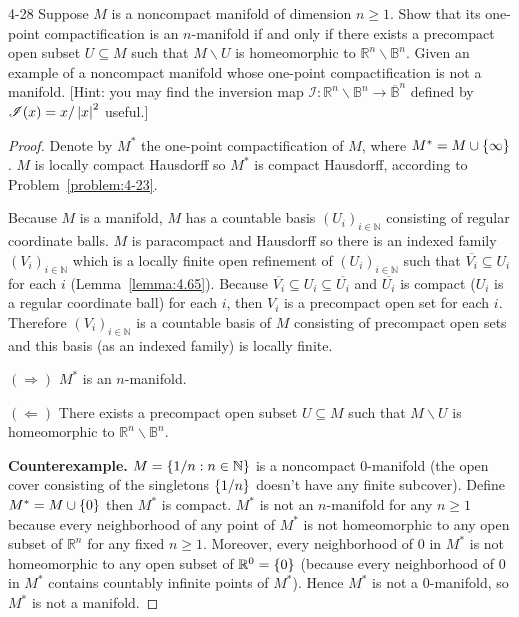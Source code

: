 \begin{problem}{4-28}
Suppose $M$ is a noncompact manifold of dimension $n\geq 1$. Show that its one-point compactification is an $n$-manifold if and only if there exists a precompact open subset $U \subseteq M$ such that $M\smallsetminus U$ is homeomorphic to $\mathbb{R}^{n} \smallsetminus \mathbb{B}^{n}$. Given an example of a noncompact manifold whose one-point compactification is not a manifold. [Hint: you may find the inversion map $\mathscr{I}: \mathbb{R}^{n} \smallsetminus \mathbb{B}^{n} \to \overline{\mathbb{B}}^{n}$ defined by $\mathscr{I}(x) = x/\left\vert{x}\right\vert^{2}$ useful.]
\end{problem}


\begin{proof}
	Denote by $M^{*}$ the one-point compactification of $M$, where $M^{*} = M \cup \left\{{\infty}\right\}$. $M$ is locally compact Hausdorff so $M^{*}$ is compact Hausdorff, according to Problem~\ref{problem:4-23}.

	Because $M$ is a manifold, $M$ has a countable basis ${(U_{i})}_{i\in\mathbb{N}}$ consisting of regular coordinate balls. $M$ is paracompact and Hausdorff so there is an indexed family ${(V_{i})}_{i\in\mathbb{N}}$ which is a locally finite open refinement of ${(U_{i})}_{i\in\mathbb{N}}$ such that $\overline{V_{i}} \subseteq U_{i}$ for each $i$ (Lemma~\ref{lemma:4.65}). Because $\overline{V_{i}} \subseteq U_{i} \subseteq \overline{U_{i}}$ and $\overline{U_{i}}$ is compact ($U_{i}$ is a regular coordinate ball) for each $i$, then $V_{i}$ is a precompact open set for each $i$. Therefore ${(V_{i})}_{i\in\mathbb{N}}$ is a countable basis of $M$ consisting of precompact open sets and this basis (as an indexed family) is locally finite.

	$(\Longrightarrow)$ $M^{*}$ is an $n$-manifold.

	$(\Longleftarrow)$ There exists a precompact open subset $U\subseteq M$ such that $M\smallsetminus U$ is homeomorphic to $\mathbb{R}^{n}\smallsetminus\mathbb{B}^{n}$.

	\textbf{Counterexample.} $M = \left\{{1/n : n\in\mathbb{N}}\right\}$ is a noncompact 0-manifold (the open cover consisting of the singletons $\left\{{1/n}\right\}$ doesn't have any finite subcover). Define $M^{*} = M \cup \left\{{0}\right\}$ then $M^{*}$ is compact. $M^{*}$ is not an $n$-manifold for any $n \geq 1$ because every neighborhood of any point of $M^{*}$ is not homeomorphic to any open subset of $\mathbb{R}^{n}$ for any fixed $n\geq 1$. Moreover, every neighborhood of 0 in $M^{*}$ is not homeomorphic to any open subset of $\mathbb{R}^{0} = \left\{{0}\right\}$ (because every neighborhood of 0 in $M^{*}$ contains countably infinite points of $M^{*}$). Hence $M^{*}$ is not a 0-manifold, so $M^{*}$ is not a manifold.
\end{proof}

